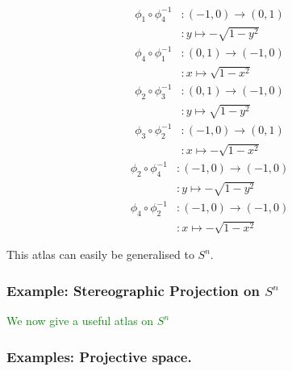 \documentclass[a4paper]{article}
\theoremstyle{definition} \newtheorem*{definition}{Definition}
\theoremstyle{definition} \newtheorem*{definitions}{Definitions}
\theoremstyle{plain} \newtheorem{theorem}{Theorem}[section]
\theoremstyle{plain} \newtheorem{proposition}[theorem]{Proposition}
\theoremstyle{plain} \newtheorem{corollary}[theorem]{Corollary}
\theoremstyle{plain} \newtheorem{lemma}[theorem]{Lemma}
\theoremstyle{plain} \newtheorem{example}[theorem]{Example}
\newcommand{\finish}[1]{\textcolor{green}{#1}}
\begin{document}
\begin{align*}
\phi_1 \circ \phi_4^{-1} & : (-1,0) \to (0,1) \\
& : y \mapsto -\sqrt{1-y^2}
\end{align*}
\begin{align*}
\phi_4 \circ \phi_1^{-1} & : (0,1) \to (-1, 0) \\
& : x \mapsto \sqrt{1-x^2}
\end{align*}
\begin{align*}
\phi_2 \circ \phi_3^{-1} & : (0,1) \to (-1, 0) \\
& : y \mapsto \sqrt{1-y^2}
\end{align*}
\begin{align*}
\phi_3 \circ \phi_2^{-1} & : (-1,0) \to (0,1)\\
& : x \mapsto -\sqrt{1-x^2}
\end{align*}
\begin{align*}
\phi_2 \circ \phi_4^{-1} & : (-1,0) \to (-1,0)\\
& : y \mapsto -\sqrt{1-y^2}
\end{align*}
\begin{align*}
\phi_4 \circ \phi_2^{-1} & : (-1,0) \to (-1,0)\\
& : x \mapsto -\sqrt{1-x^2}
\end{align*}

This atlas can easily be generalised to $S^n$.

\subsubsection{Example: Stereographic Projection on $S^n$}
\finish{We now give a useful atlas on $S^n$}

\subsubsection{Examples: Projective space.}
\end{document}
